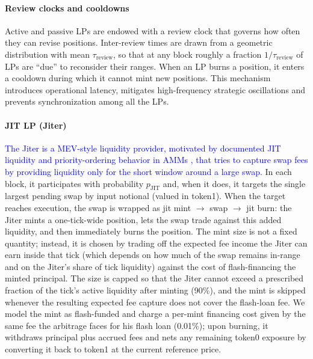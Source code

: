 \documentclass[11pt]{article}
\begin{document}
\paragraph{Review clocks and cooldowns}
Active and passive LPs are endowed with a review clock that governs how often they can revise positions.
Inter-review times are drawn from a geometric distribution with mean $\tau_{\mathrm{review}}$, so that at any
block roughly a fraction $1/\tau_{\mathrm{review}}$ of LPs are ``due'' to reconsider their ranges.
When an LP burns a position, it enters a cooldown during which it cannot mint new positions. This
mechanism introduces operational latency, mitigates high-frequency strategic oscillations and prevents
synchronization among all the LPs.

\paragraph{JIT LP (Jiter)}
\textcolor{blue}{The Jiter is a MEV-style liquidity provider, motivated by documented JIT liquidity and priority-ordering behavior in AMMs \cite{wan2022just,flashboys}, that tries to capture swap fees by providing liquidity only for the short window around a large swap.} In each block, it participates with probability $p_{\mathrm{JIT}}$ and, when it does, it targets the single largest pending swap by input notional (valued in token1). When the target reaches execution, the swap is wrapped as jit mint $\to$ swap $\to$ jit burn: the Jiter mints a one-tick-wide position, lets the swap trade against this added liquidity, and then immediately burns the position. The mint size is not a fixed quantity; instead, it is chosen by trading off the expected fee income the Jiter can earn inside that tick (which depends on how much of the swap remains in-range and on the Jiter's share of tick liquidity) against the cost of flash-financing the minted principal. The size is capped so that the Jiter cannot exceed a prescribed fraction of the tick's active liquidity after minting (90\%), and the mint is skipped whenever the resulting expected fee capture does not cover the flash-loan fee. We model the mint as flash-funded and charge a per-mint financing cost given by the same fee the arbitrage faces for his flash loan (0.01\%); upon burning, it withdraws principal plus accrued fees and nets any remaining token0 exposure by converting it back to token1 at the current reference price.
\end{document}
